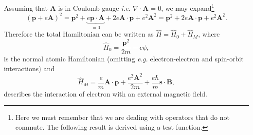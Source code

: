 Assuming that $\mathbf{A}$ is in Coulomb gauge \emph{i.e.} $\nabla \cdot \mathbf{A} = 0$, we may expand\footnote{Here we must remember that we are dealing with operators that do not commute. The following result is derived using a test function.}
\begin{equation}
(\mathbf{p} + e \mathbf{A})^2 = \mathbf{p}^2 
+ \underbrace{e \mathbf{p} \cdot\mathbf{A}}_{=0}
+ 2 e \mathbf{A} \cdot \mathbf{p}
+ e^2 \mathbf{A}^2 = \mathbf{p}^2 
+ 2 e \mathbf{A} \cdot \mathbf{p}
+ e^2 \mathbf{A}^2.
\end{equation}
Therefore the total Hamiltonian can be written as $\hat{H} = \hat{H}_0 + \hat{H}_M$, where 
\begin{equation}
\hat{H}_0 = \frac{\mathbf{p}^2}{2 m} - e \phi,
\end{equation}
is the normal atomic Hamiltonian (omitting \emph{e.g.} electron-electron and spin-orbit interactions) and 
\begin{equation}\label{eq:H_magnetic}
\hat{H}_M = \frac{e}{m}\mathbf{A}\cdot\mathbf{p} + \frac{e^2 \mathbf{A}^2}{2 m} + \frac{e \hbar}{m} \mathbf{s} \cdot \mathbf{B},
\end{equation}
describes the interaction of electron with an external magnetic field.

